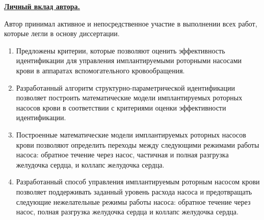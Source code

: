 
\underline{\textbf{Личный вклад автора.}}

Автор принимал активное и непосредственное участие в выполнении всех работ, которые легли в основу диссертации.


\begin{enumerate}
 \item Предложены критерии, которые позволяют оценить эффективность идентификации для управления имплантируемыми роторными насосами крови в аппаратах вспомогательного кровообращения.
  \item Разработанный алгоритм структурно-параметрической идентификации позволяет построить математические модели имплантируемых роторных насосов крови в соответствии с критериями оценки эффективности идентификации.
  \item Построенные математические модели имплантируемых роторных насосов крови позволяют определить переходы между следующими режимами работы насоса: обратное течение через насос, частичная и полная разгрузка желудочка сердца, и коллапс желудочка сердца.
  \item Разработанный способ управления имплантируемым роторным насосом крови позволяет поддерживать заданный уровень расхода насоса и предотвращать следующие нежелательные режимы работы насоса: обратное течение через насос, полная разгрузка желудочка сердца и коллапс желудочка сердца. 
\end{enumerate}


